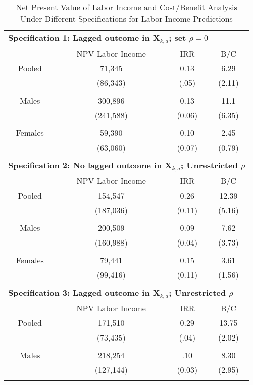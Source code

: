 \begin{table}[H] 
\begin{threeparttable}
\caption{Net Present Value of Labor Income and Cost/Benefit Analysis Under Different Specifications for Labor Income Predictions}
\label{table:predsens}
\centering 
\footnotesize
\begin{tabular}{cccc} \toprule
\multicolumn{4}{l}{ \textbf{Specification 1:  Lagged outcome in $\bm{X}_{k,a}$; set $\rho = 0$}} \\
& NPV Labor Income & IRR & B/C \\
Pooled  & 71,345 & 0.13  & 6.29 \\ 
             & (86,343) & (.05) & (2.11) \\ \\  
Males & 300,896 & 0.13  & 11.1 \\ 
               & (241,588) & (0.06)  & (6.35) \\ \\ 
Females & 59,390 & 0.10  & 2.45 \\  
          & (63,060) & (0.07) & (0.79) \\ \midrule \\ 
\multicolumn{4}{l}{\textbf{Specification 2:  No lagged outcome in $\bm{X}_{k,a}$; Unrestricted $\rho$}} \\
& NPV Labor Income & IRR & B/C \\
Pooled  & 154,547 & 0.26  & 12.39 \\ 
             & (187,036) & (0.11)  & (5.16) \\ \\
Males & 200,509 & 0.09 & 7.62 \\ 
               & (160,988) & (0.04) & (3.73) \\ \\
Females & 79,441 & 0.15 & 3.61 \\  
          & (99,416) & (0.11) & (1.56) \\ \midrule \\ 
\multicolumn{4}{l}{\textbf{Specification 3:  Lagged outcome in $\bm{X}_{k,a}$; Unrestricted $\rho$}} \\
& NPV Labor Income & IRR & B/C \\
Pooled  & 171,510 & 0.29 & 13.75 \\ 
             & (73,435) & (.04) & (2.02) \\ \\ 
Males & 218,254 & .10  & 8.30 \\ 
               & (127,144) & (0.03)  & (2.95) \\ \\  

\end{tabular}
\end{threeparttable}
\end{table}
